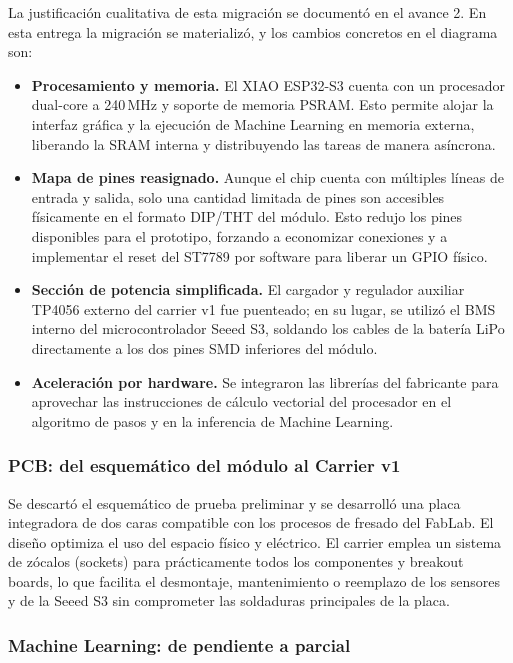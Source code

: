 \documentclass[letterpaper,11pt]{article}
\begin{document}
La justificación cualitativa de esta migración se documentó en el avance 2. En esta entrega la migración se materializó, y los cambios concretos en el diagrama son:
\begin{itemize}
    \item \textbf{Procesamiento y memoria.} El XIAO ESP32-S3 cuenta con un procesador dual-core a 240\,MHz y soporte de memoria PSRAM. Esto permite alojar la interfaz gráfica y la ejecución de Machine Learning en memoria externa, liberando la SRAM interna y distribuyendo las tareas de manera asíncrona.
    \item \textbf{Mapa de pines reasignado.} Aunque el chip cuenta con múltiples líneas de entrada y salida, solo una cantidad limitada de pines son accesibles físicamente en el formato DIP/THT del módulo. Esto redujo los pines disponibles para el prototipo, forzando a economizar conexiones y a implementar el reset del ST7789 por software para liberar un GPIO físico.
    \item \textbf{Sección de potencia simplificada.} El cargador y regulador auxiliar TP4056 externo del carrier v1 fue puenteado; en su lugar, se utilizó el BMS interno del microcontrolador Seeed S3, soldando los cables de la batería LiPo directamente a los dos pines SMD inferiores del módulo.
    \item \textbf{Aceleración por hardware.} Se integraron las librerías del fabricante para aprovechar las instrucciones de cálculo vectorial del procesador en el algoritmo de pasos y en la inferencia de Machine Learning.
\end{itemize}

\subsubsection{PCB: del esquemático del módulo al Carrier v1}

Se descartó el esquemático de prueba preliminar y se desarrolló una placa integradora de dos caras compatible con los procesos de fresado del FabLab. El diseño optimiza el uso del espacio físico y eléctrico. El carrier emplea un sistema de zócalos (sockets) para prácticamente todos los componentes y breakout boards, lo que facilita el desmontaje, mantenimiento o reemplazo de los sensores y de la Seeed S3 sin comprometer las soldaduras principales de la placa.

\subsubsection{Machine Learning: de pendiente a parcial}
\end{document}
